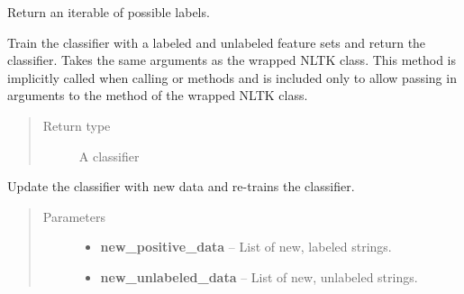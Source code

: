 \documentclass[letterpaper,10pt,english]{sphinxmanual}
\begin{document}
\begin{fulllineitems}
\begin{fulllineitems}
\end{fulllineitems}


\begin{fulllineitems}
\label{api_reference:textblob.classifiers.PositiveNaiveBayesClassifier.labels}
Return an iterable of possible labels.

\end{fulllineitems}


\begin{fulllineitems}
\label{api_reference:textblob.classifiers.PositiveNaiveBayesClassifier.train}
Train the classifier with a labeled and unlabeled feature sets and return
the classifier. Takes the same arguments as the wrapped NLTK class.
This method is implicitly called when calling  or
 methods and is included only to allow passing in arguments
to the  method of the wrapped NLTK class.
\begin{quote}\begin{description}
\item[{Return type}] \leavevmode
A classifier

\end{description}\end{quote}

\end{fulllineitems}


\begin{fulllineitems}
\label{api_reference:textblob.classifiers.PositiveNaiveBayesClassifier.update}
Update the classifier with new data and re-trains the
classifier.
\begin{quote}\begin{description}
\item[{Parameters}] \leavevmode\begin{itemize}
\item {} 
\textbf{new\_positive\_data} -- List of new, labeled strings.

\item {} 
\textbf{new\_unlabeled\_data} -- List of new, unlabeled strings.

\end{itemize}

\end{description}\end{quote}

\end{fulllineitems}


\end{fulllineitems}
\end{document}
